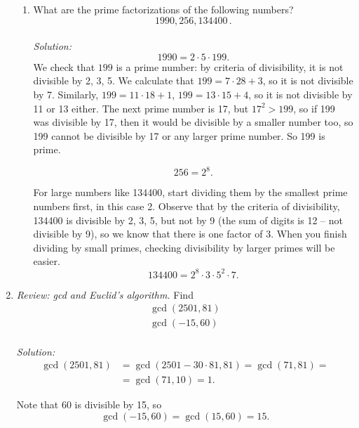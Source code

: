 \documentclass[12pt]{amsart}
\begin{document}
\begin{enumerate}[label=\arabic*.,itemsep=10pt, leftmargin=*]
\begin{enumerate}
        \item What are the prime factorizations of the following numbers?
        \begin{equation*}
            1990, 256, 134400 \,.
        \end{equation*}
    \\ \textit{Solution:}
    $$ 1990 = 2\cdot 5\cdot 199
    .$$
    We check that $199$ is a prime number: by criteria of divisibility, it is not divisible by 2, 3, 5. We calculate that $199 = 7 \cdot 28 + 3$, so it is not divisible by 7. Similarly, $199 = 11 \cdot 18 + 1$, $199 = 13\cdot 15 + 4$, so it is not divisible by 11 or 13 either. The next prime number is 17, but $17^2 > 199$, so if 199 was divisible by 17, then it would be divisible by a smaller number too, so 199 cannot be divisible by 17 or any larger prime number. So 199 is prime.
    
    $$ 256 = 2^8
    .$$
    
    For large numbers like 134400, start dividing them by the smallest prime numbers first, in this case 2. Observe that by the criteria of divisibility, 134400 is divisible by 2, 3, 5, but not by 9 (the sum of digits is 12 -- not divisible by 9), so we know that there is one factor of 3. When you finish dividing by small primes, checking divisibility by larger primes will be easier.
    $$ 134400 = 2^8 \cdot 3 \cdot 5^2 \cdot 7
    .$$
    \end{enumerate}
    
    
    

\item
    \textit{Review: gcd and Euclid's algorithm.}
    Find 
    \begin{gather*}
        \gcd(2501, 81)\\
        \gcd(-15, 60)
    \end{gather*}
\\ \textit{Solution:}
\begin{equation*}
\begin{split}
    \gcd(2501, 81) &= \gcd( 2501 - 30\cdot 81, 81) =
    \gcd(71,81) =\\ &= \gcd(71,10) = 1.
\end{split}
\end{equation*}

Note that 60 is divisible by 15, so
$$ \gcd(-15, 60) = \gcd(15, 60) = 15 
 .$$
\end{enumerate}
\end{document}
